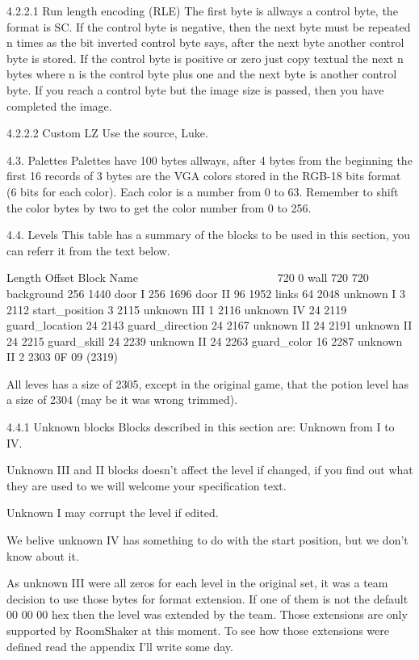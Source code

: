 4.2.2.1 Run length encoding (RLE)
 The first byte is allways a control byte, the format is SC. If the control
 byte is negative, then the next byte must be repeated n times as the bit
 inverted control byte says, after the next byte another control byte is
 stored.
 If the control byte is positive or zero just copy textual the next n bytes
 where n is the control byte plus one and the next byte is another control
 byte.
 If you reach a control byte but the image size is passed, then you have
 completed the image.

4.2.2.2 Custom LZ
 Use the source, Luke.
 
4.3. Palettes
 Palettes have 100 bytes allways, after 4 bytes from the beginning the
 first 16 records of 3 bytes are the VGA colors stored in the RGB-18 bits
 format (6 bits for each color). Each color is a number from 0 to 63.
 Remember to shift the color bytes by two to get the color number from 0
 to 256.
 
4.4. Levels
 This table has a summary of the blocks to be used in this section,
 you can referr it from the text below.

 Length Offset  Block Name
 ~~~~~~ ~~~~~~  ~~~~~~~~~~
 720    0       wall
 720    720     background
 256    1440    door I
 256    1696    door II
 96     1952    links
 64     2048    unknown I
 3      2112    start_position
 3      2115    unknown III
 1      2116    unknown IV
 24     2119    guard_location
 24     2143    guard_direction
 24     2167    unknown II
 24     2191    unknown II
 24     2215    guard_skill
 24     2239    unknown II
 24     2263    guard_color
 16     2287    unknown II
 2      2303    0F 09 (2319)

 All leves has a size of 2305, except in the original game, that the potion
 level has a size of 2304 (may be it was wrong trimmed).

4.4.1 Unknown blocks
 Blocks described in this section are: Unknown from I to IV.

 Unknown III and II blocks doesn't affect the level if changed, if you find
 out what they are used to we will welcome your specification text.

 Unknown I may corrupt the level if edited.

 We belive unknown IV has something to do with the start position, but we
 don't know about it.

 As unknown III were all zeros for each level in the original set, it was a
 team decision to use those bytes for format extension. If one of them is
 not the default 00 00 00 hex then the level was extended by the team. Those
 extensions are only supported by RoomShaker at this  moment. To see how
 those extensions were defined read the appendix I'll write some day.
 
